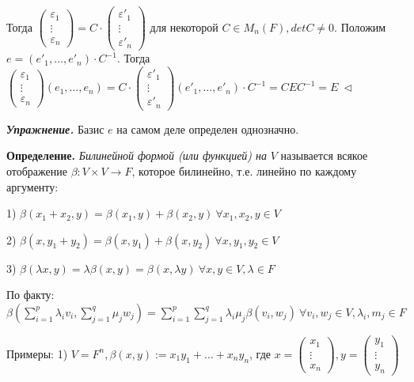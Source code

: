 \vspace{\baselineskip}
Тогда $\begin{pmatrix} \varepsilon_1 \\ \vdots \\ \varepsilon_n \end{pmatrix} = C \cdot \begin{pmatrix} \varepsilon'_1 \\ \vdots \\ \varepsilon'_n \end{pmatrix}$ для некоторой $C \in M_n(F), detC \neq 0$. Положим $e = (e'_1, \dots, e'_n) \cdot C^{-1}$. Тогда $\begin{pmatrix} \varepsilon_1 \\ \vdots \\ \varepsilon_n \end{pmatrix} (e_1, \dots, e_n) = C \cdot \begin{pmatrix} \varepsilon'_1 \\ \vdots \\ \varepsilon'_n \end{pmatrix} (e'_1, \dots, e'_n) \cdot C^{-1} = CEC^{-1} = E \ \lhd$

\vspace{\baselineskip}
\textbf{\textit{Упражнение.}} Базис $e$ на самом деле определен однозначно.

\vspace{\baselineskip}
\textbf{Определение.} \textit{Билинейной формой (или функцией) на} $V$ называется всякое отображение $\beta: V \times V \rightarrow F$, которое билинейно, т.е. линейно по каждому аргументу:

1) $\beta(x_1 + x_2, y) = \beta(x_1, y) + \beta(x_2, y) \ \forall x_1, x_2, y \in V$

2) $\beta(x, y_1 + y_2) = \beta(x, y_1) + \beta(x, y_2) \ \forall x, y_1, y_2 \in V$

3) $\beta(\lambda x, y) = \lambda \beta(x, y) = \beta(x, \lambda y) \ \forall x, y \in V, \lambda \in F$

\vspace{\baselineskip}
По факту: $\beta (\sum\limits_{i=1}^p \lambda_i v_i, \sum\limits_{j=1}^q \mu_j w_j) = \sum\limits_{i=1}^p \sum\limits_{j=1}^q \lambda_i \mu_j \beta(v_i, w_j) \ \forall v_i, w_j \in V, \lambda_i, m_j \in F$

\vspace{\baselineskip}
Примеры: 1) $V = F^n, \beta(x, y):= x_1 y_1 + \dots + x_n y_n$, где $x = \begin{pmatrix} x_1 \\ \vdots \\ x_n \end{pmatrix}, y = \begin{pmatrix} y_1 \\ \vdots \\ y_n \end{pmatrix}$

